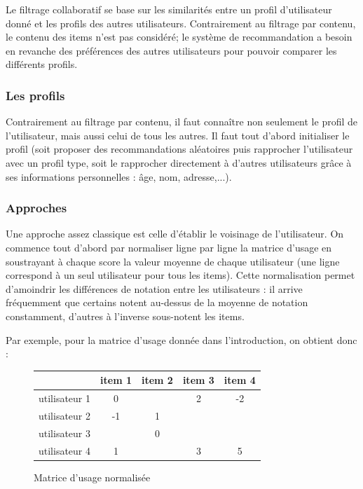 \documentclass{article}
\begin{document}
Le filtrage collaboratif se base sur les similarités entre un profil d'utilisateur donné et les profils des autres utilisateurs.
Contrairement au filtrage par contenu, le contenu des items n'est pas considéré; le système de recommandation a besoin en revanche des préférences des autres utilisateurs pour pouvoir comparer les différents profils\cite{theseBC}. 

\subsubsection{Les profils}

Contrairement au filtrage par contenu, il faut connaître non seulement le profil de l'utilisateur, mais aussi celui de tous les autres. Il faut tout d'abord initialiser le profil (soit proposer des recommandations aléatoires puis rapprocher l'utilisateur avec un profil type, soit le rapprocher directement à d'autres utilisateurs grâce à ses informations personnelles : âge, nom, adresse,...).


\subsubsection{Approches}

Une approche assez classique est celle d'établir le voisinage de l'utilisateur. On commence tout d'abord par normaliser ligne par ligne la matrice d'usage\cite{diapo} en soustrayant à chaque score la valeur moyenne de chaque utilisateur (une ligne correspond à un seul utilisateur pour tous les items). Cette normalisation permet d'amoindrir les différences de notation entre les utilisateurs : il arrive fréquemment que certains notent au-dessus de la moyenne de notation constamment, d'autres à l'inverse sous-notent les items. 

Par exemple, pour la matrice d'usage donnée dans l'introduction, on obtient donc : 


\begin{figure}[!h]
\begin{center}
\begin{tabular}{|c|c|c|c|c|}
\hline
&item 1&item 2&item 3&item 4\\
\hline
utilisateur 1&0&&2&-2\\
\hline
utilisateur 2&-1&1&&\\
\hline
utilisateur 3&&0&&\\
\hline
utilisateur 4&1&&3&5\\
\hline
\end{tabular}
\newline\newline
\caption{Matrice d'usage normalisée}
\end{center}
\end{figure}
\end{document}
